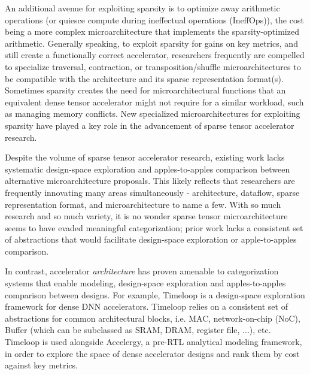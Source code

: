 An additional avenue for exploiting sparsity is to optimize away arithmetic operations\cite{eyerissv2}\cite{sparten}\cite{extensor}\cite{sparch}\cite{szebook}\cite{sparseloop} (or quiesce compute during ineffectual operations (IneffOps)\cite{eyeriss}\cite{sparseloop}\cite{szebook}), the cost being a more complex microarchitecture that implements the sparsity-optimized arithmetic\cite{eyeriss}\cite{eyerissv2}. Generally speaking, to exploit sparsity for gains on key metrics, and still create a functionally correct accelerator, researchers frequently are compelled to specialize traversal\cite{szebook}\cite{extensor}, contraction\cite{gamma}\cite{eyerissv2}\cite{extensor}\cite{sparten}, or transposition/shuffle\cite{gamma} microarchitectures to be compatible with the architecture and its sparse representation format(s). Sometimes sparsity creates the need for microarchitectural functions that an equivalent dense tensor accelerator might not require for a similar workload, such as managing memory conflicts\cite{scnn}\cite{sparten}. New specialized microarchitectures for exploiting sparsity have played a key role in the advancement of sparse tensor accelerator research\cite{gamma}\cite{outerspace}\cite{extensor}\cite{sparch}\cite{outerspace}\cite{ampere}.

Despite the volume of sparse tensor accelerator research, existing work lacks systematic design-space exploration and apples-to-apples comparison between alternative microarchitecture proposals. This likely reflects that researchers are frequently innovating many areas simultaneously - architecture, dataflow, sparse representation format, and microarchitecture to name a few\cite{gamma}\cite{matraptor}\cite{eyeriss}\cite{candles}. With so much research and so much variety, it is no wonder sparse tensor microarchitecture seems to have evaded meaningful categorization; prior work lacks a consistent set of abstractions that would facilitate design-space exploration or apple-to-apples comparison.

In contrast, accelerator \textit{architecture} has proven amenable to categorization systems that enable modeling, design-space exploration and apples-to-apples comparison between designs\cite{timeloop}\cite{sparseloop}\cite{accelergy}\cite{buffet}. For example, Timeloop\cite{timeloop} is a design-space exploration framework for dense DNN accelerators. Timeloop relies on a consistent set of abstractions for common architectural blocks, i.e. MAC, network-on-chip (NoC), Buffer (which can be subclassed as SRAM, DRAM, register file, ...), etc. Timeloop is used alongside Accelergy\cite{accelergy}, a pre-RTL analytical modeling framework, in order to explore the space of dense accelerator designs and rank them by cost against key metrics.

